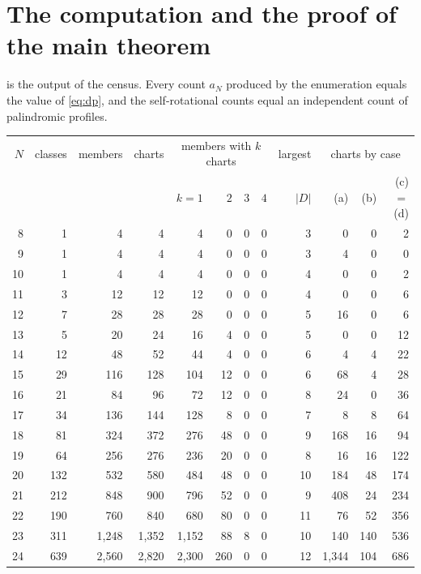 \documentclass[11pt,a4paper]{amsart}
\numberwithin{equation}{section}
\theoremstyle{plain}
\theoremstyle{definition}
\begin{document}
\section{The computation and the proof of the main theorem}\label{sec:results}

 is the output of the census.  Every count \(a_N\) produced by the enumeration equals the value of \eqref{eq:dp}, and the self-rotational counts equal an independent count of palindromic profiles.

\begin{table}[ht]
\centering
\footnotesize
\begin{tabular}{rrrrrrrrrrrr}
\toprule
\(N\) & classes & members & charts & \multicolumn{4}{c}{members with \(k\) charts} & largest & \multicolumn{3}{c}{charts by case} \\
 & & & & \(k=1\) & \(2\) & \(3\) & \(4\) & \(|D|\) & (a) & (b) & (c) \(=\) (d)\\
\midrule
8 & 1 & 4 & 4 & 4 & 0 & 0 & 0 & 3 & 0 & 0 & 2 \\
9 & 1 & 4 & 4 & 4 & 0 & 0 & 0 & 3 & 4 & 0 & 0 \\
10 & 1 & 4 & 4 & 4 & 0 & 0 & 0 & 4 & 0 & 0 & 2 \\
11 & 3 & 12 & 12 & 12 & 0 & 0 & 0 & 4 & 0 & 0 & 6 \\
12 & 7 & 28 & 28 & 28 & 0 & 0 & 0 & 5 & 16 & 0 & 6 \\
13 & 5 & 20 & 24 & 16 & 4 & 0 & 0 & 5 & 0 & 0 & 12 \\
14 & 12 & 48 & 52 & 44 & 4 & 0 & 0 & 6 & 4 & 4 & 22 \\
15 & 29 & 116 & 128 & 104 & 12 & 0 & 0 & 6 & 68 & 4 & 28 \\
16 & 21 & 84 & 96 & 72 & 12 & 0 & 0 & 8 & 24 & 0 & 36 \\
17 & 34 & 136 & 144 & 128 & 8 & 0 & 0 & 7 & 8 & 8 & 64 \\
18 & 81 & 324 & 372 & 276 & 48 & 0 & 0 & 9 & 168 & 16 & 94 \\
19 & 64 & 256 & 276 & 236 & 20 & 0 & 0 & 8 & 16 & 16 & 122 \\
20 & 132 & 532 & 580 & 484 & 48 & 0 & 0 & 10 & 184 & 48 & 174 \\
21 & 212 & 848 & 900 & 796 & 52 & 0 & 0 & 9 & 408 & 24 & 234 \\
22 & 190 & 760 & 840 & 680 & 80 & 0 & 0 & 11 & 76 & 52 & 356 \\
23 & 311 & 1{,}248 & 1{,}352 & 1{,}152 & 88 & 8 & 0 & 10 & 140 & 140 & 536 \\
24 & 639 & 2{,}560 & 2{,}820 & 2{,}300 & 260 & 0 & 0 & 12 & 1{,}344 & 104 & 686 \\

\end{tabular}
\end{table}
\end{document}
